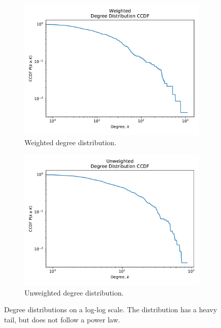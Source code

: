 \begin{figure}[ht]
    \centering
    \begin{subfigure}{0.4\textwidth}
        \includegraphics[width=1.\textwidth]{images/weighted_degree_distr_ccdf.pdf}
        \caption{Weighted degree distribution.}
    \end{subfigure}
    \begin{subfigure}{0.4\textwidth}
        \includegraphics[width=1.\textwidth]{images/unweighted_degree_distr_ccdf.pdf}
        \caption{Unweighted degree distribution.}
    \end{subfigure}
    \caption{Degree distributions on a log-log scale. The distribution has a heavy tail, but does not follow a power law.}
    \label{fig:degree_distr}
\end{figure}

